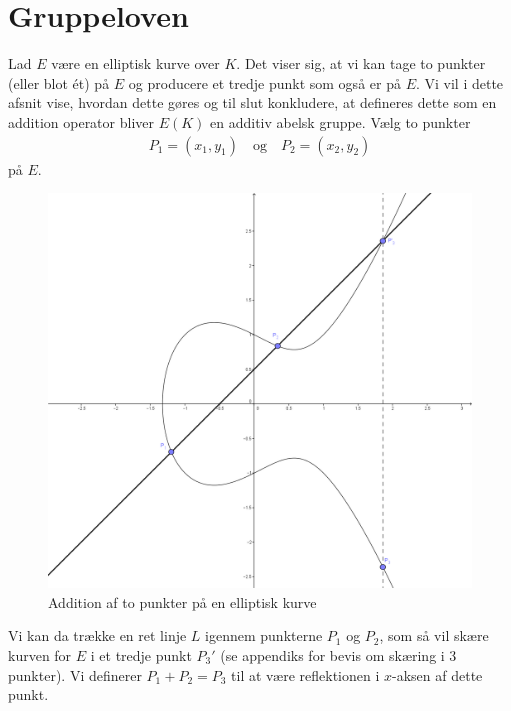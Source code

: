 \section{Gruppeloven}
Lad $E$ være en elliptisk kurve over $K$. Det viser sig, at vi kan tage to punkter (eller blot ét) på $E$ og producere et tredje punkt som også er på $E$. Vi vil i dette afsnit vise, hvordan dette gøres og til slut konkludere, at defineres dette som en addition operator bliver $E(K)$ en additiv abelsk gruppe. Vælg to punkter
\begin{align*}
	P_1 = (x_1, y_1) \quad \text{og} \quad P_2 = (x_2, y_2)
\end{align*}
på $E$. 
\begin{figure}
\label{figure_addition_law}
\centering
\includegraphics[scale=0.25]{elliptic_3}
\caption{Addition af to punkter på en elliptisk kurve}
\end{figure}
Vi kan da trække en ret linje $L$ igennem punkterne $P_1$ og $P_2$, som så vil skære kurven for $E$ i et tredje punkt ${P_3}'$ (se appendiks for bevis om skæring i 3 punkter). Vi definerer $P_1 + P_2 = P_3$ til at være reflektionen i $x$-aksen af dette punkt. 

